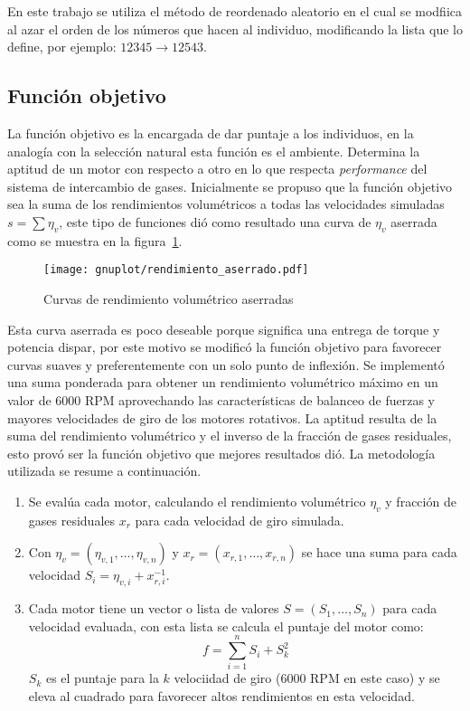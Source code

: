 En este trabajo se utiliza el método de reordenado aleatorio en el cual se
modfiica al azar el orden de los números que hacen al individuo, modificando la
lista que lo define, por ejemplo: $12345 \rightarrow 12543$.

\subsection{Función objetivo}\label{sec:funcion_objetivo}
%
La función objetivo es la encargada de dar puntaje a los individuos, en la
analogía con la selección natural esta función es el ambiente.
%
Determina la aptitud de un motor con respecto a otro en lo que respecta
\emph{performance} del sistema de intercambio de gases.
%
Inicialmente se propuso que la función objetivo sea la suma de los rendimientos
volumétricos a todas las velocidades simuladas $s=\sum \eta_{v}$, este tipo de
funciones dió como resultado una curva de $\eta_{v}$ aserrada como se muestra en
la figura~\ref{fig:curva_aserrada}.

\begin{figure}[ht]
  \centering
  \texttt{[image: gnuplot/rendimiento\_aserrado.pdf]}
  \caption{Curvas de rendimiento volumétrico aserradas}\label{fig:curva_aserrada}
\end{figure}

Esta curva aserrada es poco deseable porque significa una entrega de torque y
potencia dispar, por este motivo se modificó la función objetivo para favorecer
curvas suaves y preferentemente con un solo punto de inflexión.
%
Se implementó una suma ponderada para obtener un rendimiento volumétrico máximo
en un valor de 6000 RPM aprovechando las características de balanceo de fuerzas
y mayores velocidades de giro de los motores rotativos.
%
La aptitud resulta de la suma del rendimiento volumétrico y el inverso de la
fracción de gases residuales, esto provó ser la función objetivo que mejores
resultados dió.
%
La metodología utilizada se resume a continuación.

\begin{enumerate}
        \item Se evalúa cada motor, calculando el rendimiento volumétrico
$\eta_{v}$ y fracción de gases residuales $x_{r}$ para cada velocidad de giro
simulada.
        \item Con $\eta_{v} = (\eta_{v,1}, \ldots ,\eta_{v,n})$ y
$x_{r}=(x_{r,1},\ldots,x_{r,n})$ se hace una suma para cada velocidad
$S_{i}=\eta_{v,i} + x_{r,i}^{-1}$.
        \item Cada motor tiene un vector o lista de valores
$S = (S_{1},\ldots,S_{n})$ para cada velocidad evaluada, con esta lista se
        calcula el puntaje del motor como:
        \begin{equation}
        f = \sum_{i=1}^{n}{S_{i}} + S_{k}^{2}
        \end{equation} $S_{k}$ es el puntaje para la $k$ velociidad de giro
(6000 RPM en este caso) y se eleva al cuadrado para favorecer altos rendimientos
en esta velocidad.
\end{enumerate}


